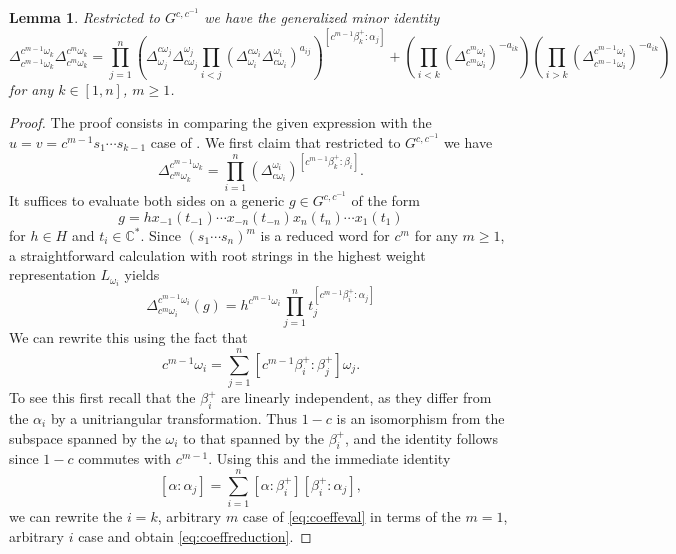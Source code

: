 \documentclass[11pt]{amsart}
\newcommand{\sayHW}[1]{\say[HW]{\color{violet}{\bf HW:}\;#1}}
\newcommand{\bC}{\mathbb{C}}
\newtheorem{lemma}[theorem]{Lemma}
\begin{document}
\begin{lemma}\label{lem:minorsondbc}
Restricted to $G^{c,c^{-1}}$ we have the generalized minor identity
\begin{equation}
\Delta_{c^{m-1}\omega_k}^{c^{m-1}\omega_k}\Delta_{c^{m}\omega_k}^{c^{m}\omega_k} = 
\prod_{j=1}^n \left( \Delta^{c \omega_j}_{\omega_j}\Delta^{\omega_j}_{ c\omega_j} \prod_{i < j}(\Delta^{c \omega_i}_{\omega_i} \Delta^{\omega_i}_{c \omega_i})^{a_{ij}}\right)^{[c^{m-1} \beta_k^+:\alpha_j]} + 
\left(\prod_{i < k}(\Delta_{c^{m}\omega_i}^{c^{m}\omega_i})^{-a_{ik}}\right)\left(\prod_{i>k}(\Delta_{c^{m-1}\omega_i}^{c^{m-1}\omega_i})^{-a_{ik}}\right)
\end{equation}
for any $k \in [1,n]$, $m \geq 1$.  
\end{lemma}
\begin{proof}
The proof consists in comparing the given expression with the $u = v = c^{m-1}s_1 \cdots s_{k-1}$ case of .  We first claim that restricted to $G^{c,c^{-1}}$ we have
\begin{equation}\label{eq:coeffreduction}
\Delta_{c^m \omega_k}^{c^{m-1} \omega_k} = 
\prod_{i=1}^n (\Delta_{c \omega_i}^{\omega_i})^{[c^{m-1}\beta_k^+:\beta_i]}.
\end{equation}
 It suffices to evaluate both sides on a generic $g \in G^{c,c^{-1}}$ of the form
\[
g = hx_{-1}(t_{-1}) \cdots x_{-n}(t_{-n}) x_{n}(t_{n}) \cdots x_{1}(t_{1})
\]
for $h \in H$ and $t_i \in \bC^*$.  Since $(s_1 \cdots s_n)^m$ is a reduced word for $c^m$ for any $m \geq 1$\sayHW{citation needed?}, a straightforward calculation with root strings in the highest weight representation $L_{\omega_i}$ yields
\begin{equation}\label{eq:coeffeval}
\Delta_{c^m \omega_i}^{c^{m-1}\omega_i}(g) = h^{c^{m-1}\omega_i} \prod_{j=1}^n t_j^{[c^{m-1}\beta_i^+:\alpha_j]}
\end{equation}
We can rewrite this using the fact that
\[
c^{m-1} \omega_i = \sum_{j=1}^n [c^{m-1}\beta_i^+:\beta_j^+]\omega_j.
\]
To see this first recall that the $\beta_i^+$ are linearly independent, as they differ from the $\alpha_i$ by a unitriangular transformation.  Thus $1-c$ is an isomorphism from the subspace spanned by the $\omega_i$ to that spanned by the $\beta_i^+$, and the identity follows since $1-c$ commutes with $c^{m-1}$.  Using this and the immediate identity
\[
[\alpha:\alpha_j] = \sum_{i=1}^n [\alpha:\beta_i^+][\beta_i^+:\alpha_j],
\]
we can rewrite the $i = k$, arbitrary $m$ case of \cref{eq:coeffeval} in terms of the $m = 1$, arbitrary $i$ case and obtain \cref{eq:coeffreduction}.


\end{proof}
\end{document}
